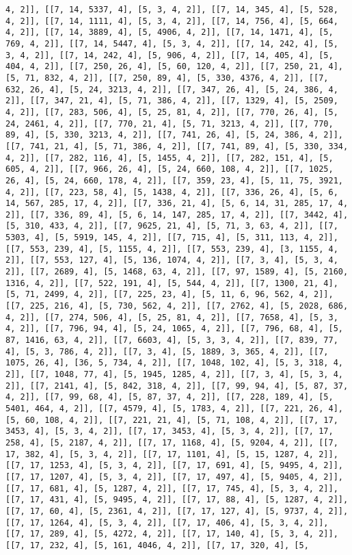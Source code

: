 \documentclass[12pt,fleqn]{article}\usepackage{../../common}
\begin{document}
\begin{verbatim}
4, 2]], [[7, 14, 5337, 4], [5, 3, 4, 2]], [[7, 14, 345, 4], [5, 528, 4, 2]], [[7, 14, 1111, 4], [5, 3, 4, 2]], [[7, 14, 756, 4], [5, 664, 4, 2]], [[7, 14, 3889, 4], [5, 4906, 4, 2]], [[7, 14, 1471, 4], [5, 769, 4, 2]], [[7, 14, 5447, 4], [5, 3, 4, 2]], [[7, 14, 242, 4], [5, 3, 4, 2]], [[7, 14, 242, 4], [5, 906, 4, 2]], [[7, 14, 405, 4], [5, 404, 4, 2]], [[7, 250, 26, 4], [5, 60, 120, 4, 2]], [[7, 250, 21, 4], [5, 71, 832, 4, 2]], [[7, 250, 89, 4], [5, 330, 4376, 4, 2]], [[7, 632, 26, 4], [5, 24, 3213, 4, 2]], [[7, 347, 26, 4], [5, 24, 386, 4, 2]], [[7, 347, 21, 4], [5, 71, 386, 4, 2]], [[7, 1329, 4], [5, 2509, 4, 2]], [[7, 283, 506, 4], [5, 25, 81, 4, 2]], [[7, 770, 26, 4], [5, 24, 2461, 4, 2]], [[7, 770, 21, 4], [5, 71, 3213, 4, 2]], [[7, 770, 89, 4], [5, 330, 3213, 4, 2]], [[7, 741, 26, 4], [5, 24, 386, 4, 2]], [[7, 741, 21, 4], [5, 71, 386, 4, 2]], [[7, 741, 89, 4], [5, 330, 334, 4, 2]], [[7, 282, 116, 4], [5, 1455, 4, 2]], [[7, 282, 151, 4], [5, 605, 4, 2]], [[7, 966, 26, 4], [5, 24, 660, 108, 4, 2]], [[7, 1025, 26, 4], [5, 24, 660, 178, 4, 2]], [[7, 359, 23, 4], [5, 11, 75, 3921, 4, 2]], [[7, 223, 58, 4], [5, 1438, 4, 2]], [[7, 336, 26, 4], [5, 6, 14, 567, 285, 17, 4, 2]], [[7, 336, 21, 4], [5, 6, 14, 31, 285, 17, 4, 2]], [[7, 336, 89, 4], [5, 6, 14, 147, 285, 17, 4, 2]], [[7, 3442, 4], [5, 310, 433, 4, 2]], [[7, 9625, 21, 4], [5, 71, 3, 63, 4, 2]], [[7, 5303, 4], [5, 5919, 145, 4, 2]], [[7, 715, 4], [5, 311, 113, 4, 2]], [[7, 553, 239, 4], [5, 1155, 4, 2]], [[7, 553, 239, 4], [3, 1155, 4, 2]], [[7, 553, 127, 4], [5, 136, 1074, 4, 2]], [[7, 3, 4], [5, 3, 4, 2]], [[7, 2689, 4], [5, 1468, 63, 4, 2]], [[7, 97, 1589, 4], [5, 2160, 1316, 4, 2]], [[7, 522, 191, 4], [5, 544, 4, 2]], [[7, 1300, 21, 4], [5, 71, 2499, 4, 2]], [[7, 225, 23, 4], [5, 11, 6, 96, 562, 4, 2]], [[7, 225, 216, 4], [5, 730, 562, 4, 2]], [[7, 2762, 4], [5, 2028, 686, 4, 2]], [[7, 274, 506, 4], [5, 25, 81, 4, 2]], [[7, 7658, 4], [5, 3, 4, 2]], [[7, 796, 94, 4], [5, 24, 1065, 4, 2]], [[7, 796, 68, 4], [5, 87, 1416, 63, 4, 2]], [[7, 6603, 4], [5, 3, 3, 4, 2]], [[7, 839, 77, 4], [5, 3, 786, 4, 2]], [[7, 3, 4], [5, 1889, 3, 365, 4, 2]], [[7, 1075, 26, 4], [36, 5, 734, 4, 2]], [[7, 1048, 102, 4], [5, 3, 318, 4, 2]], [[7, 1048, 77, 4], [5, 1945, 1285, 4, 2]], [[7, 3, 4], [5, 3, 4, 2]], [[7, 2141, 4], [5, 842, 318, 4, 2]], [[7, 99, 94, 4], [5, 87, 37, 4, 2]], [[7, 99, 68, 4], [5, 87, 37, 4, 2]], [[7, 228, 189, 4], [5, 5401, 464, 4, 2]], [[7, 4579, 4], [5, 1783, 4, 2]], [[7, 221, 26, 4], [5, 60, 108, 4, 2]], [[7, 221, 21, 4], [5, 71, 108, 4, 2]], [[7, 17, 3453, 4], [5, 3, 4, 2]], [[7, 17, 3453, 4], [5, 3, 4, 2]], [[7, 17, 258, 4], [5, 2187, 4, 2]], [[7, 17, 1168, 4], [5, 9204, 4, 2]], [[7, 17, 382, 4], [5, 3, 4, 2]], [[7, 17, 1101, 4], [5, 15, 1287, 4, 2]], [[7, 17, 1253, 4], [5, 3, 4, 2]], [[7, 17, 691, 4], [5, 9495, 4, 2]], [[7, 17, 1207, 4], [5, 3, 4, 2]], [[7, 17, 497, 4], [5, 9405, 4, 2]], [[7, 17, 681, 4], [5, 1287, 4, 2]], [[7, 17, 745, 4], [5, 3, 4, 2]], [[7, 17, 431, 4], [5, 9495, 4, 2]], [[7, 17, 88, 4], [5, 1287, 4, 2]], [[7, 17, 60, 4], [5, 2361, 4, 2]], [[7, 17, 127, 4], [5, 9737, 4, 2]], [[7, 17, 1264, 4], [5, 3, 4, 2]], [[7, 17, 406, 4], [5, 3, 4, 2]], [[7, 17, 289, 4], [5, 4272, 4, 2]], [[7, 17, 140, 4], [5, 3, 4, 2]], [[7, 17, 232, 4], [5, 161, 4046, 4, 2]], [[7, 17, 320, 4], [5, 
\end{verbatim}
\end{document}
